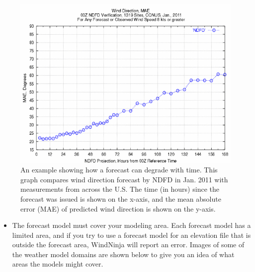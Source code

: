 \documentclass[12pt]{article}
\begin{document}
\begin{figure}[H]
	\centering
	\label{ndfd_degrade}
	\includegraphics[scale=0.75]{degrade_w_time}
	\caption*{An example showing how a forecast can degrade with time.  This graph compares wind direction forecast by NDFD in Jan. 2011 with measurements from across the U.S.  The time (in hours) since the forecast was issued is shown on the x-axis, and the mean absolute error (MAE) of predicted wind direction is shown on the y-axis.}
\end{figure}

\begin{itemize}
\item The forecast model must cover your modeling area.  Each forecast model has a limited area, and if you try to use a forecast model for an elevation file that is outside the forecast area, WindNinja will report an error.  Images of some of the weather model domains are shown below to give you an idea of what areas the models might cover.
\end{itemize}
\end{document}
